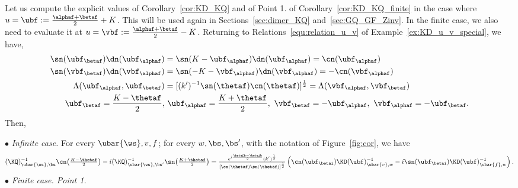 \documentclass[a4paper,twoside,11pt]{article}
\begin{document}
\begin{exm}\label{ex:KQ_KD_u_v_special}
Let us compute the explicit values of Corollary~\ref{cor:KD_KQ} and of Point 1. of Corollary~\ref{cor:KD_KQ_finite} in the case where
$u=\ubf:=\frac{\alphaf+\betaf}{2}+K$. This will be used again in Sections~\ref{sec:dimer_KQ} and~\ref{sec:GQ_GF_Zinv}.
In the finite case, we also need to evaluate it at $u=\vbf:=\frac{\alphaf+\betaf}{2}-K$. Returning to Relations~\eqref{equ:relation_u_v} of
Example~\ref{ex:KD_u_v_special}, we have,
\begin{align*}
\sn(\ubf_{\betaf})\dn(\ubf_{\alphaf})&=\sn(K-\ubf_{\alphaf})\dn(\ubf_{\alphaf})=\cn(\ubf_{\alphaf})\\
\sn(\vbf_{\betaf})\dn(\vbf_{\alphaf})&=\sn(-K-\vbf_{\alphaf})\dn(\vbf_{\alphaf})=-\cn(\vbf_{\alphaf})\\
\Lambda(\ubf_{\alphaf},\ubf_{\betaf})&=[(k')^{-1}\sn(\thetaf)\cn(\thetaf)]^{\frac{1}{2}}=
\Lambda(\vbf_{\alphaf},\vbf_{\betaf})\\
\ubf_{\betaf}=\frac{K-\thetaf}{2},&\ \ubf_{\alphaf}=\frac{K+\thetaf}{2},\ \vbf_{\betaf}=-\ubf_{\alphaf},\ \vbf_{\alphaf}=-\ubf_{\betaf}.
\end{align*}
Then, 

$\bullet$ \emph{Infinite case.} For every $\ubar{\ws},v,f$; for every $w,\bs,\bs'$, with the notation of Figure~\ref{fig:cor}, we have
\begin{equation*}
\textstyle
(\KQ)^{-1}_{\ubar{\ws},\bs}\cn\bigl(\frac{K-\thetaf}{2}\bigr)-i(\KQ)^{-1}_{\ubar{\ws},\bs'}\sn\bigl(\frac{K+\thetaf}{2}\bigr)
=\frac{e^{i\frac{\betafb-\betaib}{2}}(k')^{\frac{1}{2}}}{[\cn(\thetaf)\sn(\thetaf)]^{\frac{1}{2}}}
\left(\cn(\ubf_{\betai})\KD(\ubf)^{-1}_{\ubar{v},w}-i\sn({\ubf_{\betai}})\KD(\ubf)^{-1}_{\ubar{f},w}\right).
\end{equation*}
$\bullet$ \emph{Finite case. Point 1.}


\end{exm}
\end{document}
